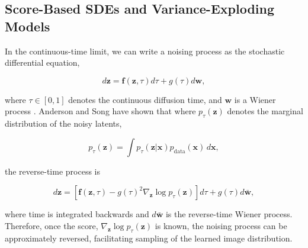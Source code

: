 

\subsection{Score-Based SDEs and Variance-Exploding Models}
\label{sec:score_based_sdes}

In the continuous-time limit, we can write a noising process as the stochastic differential equation,

\begin{equation}
d\mathbf{z}=\mathbf{f}(\mathbf{z},\tau)d\tau+g(\tau)d\mathbf{w},
\label{eq:general_sde}
\end{equation}

where $\tau\in [0,1]$ denotes the continuous diffusion time, and $\mathbf{w}$ is a Wiener process \cite{}. Anderson and Song \cite{} have shown that where $p_\tau(\mathbf{z})$ denotes the marginal distribution of the noisy latents,

\begin{equation}
p_\tau(\mathbf{z})=\int p_\tau (\mathbf{z}|\mathbf{x})p_{\mathrm{data}}(\mathbf{x})\, d\mathbf{x},
\label{eq:marginal}
\end{equation}

the reverse-time process is

\begin{equation}
d\mathbf{z}=\left[\mathbf{f}(\mathbf{z},\tau)-g(\tau)^2\nabla_{\mathbf{z}}\log p_\tau(\mathbf{z})\right]d\tau+g(\tau)d\bar{\mathbf{w}},
\label{eq:reverse_time_sde}
\end{equation}

where time is integrated backwards and $d\bar {\mathbf{w}}$ is the reverse-time Wiener process. Therefore, once the score, $\nabla_\mathbf{z} \log p_\tau(\mathbf{z})$ is known, the noising process can be approximately reversed, facilitating sampling of the learned image distribution.

